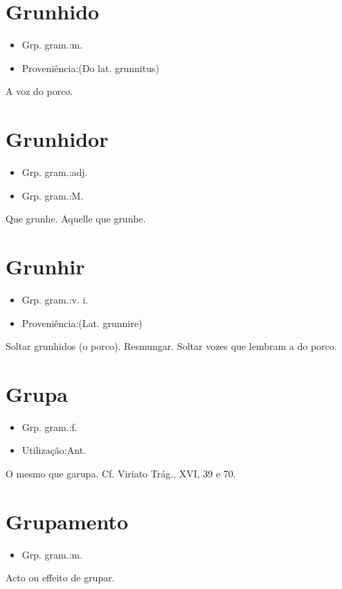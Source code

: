 \section{Grunhido}
\begin{itemize}
\item {Grp. gram.:m.}
\end{itemize}
\begin{itemize}
\item {Proveniência:(Do lat. \textunderscore grunnitus\textunderscore )}
\end{itemize}
A voz do porco.
\section{Grunhidor}
\begin{itemize}
\item {Grp. gram.:adj.}
\end{itemize}
\begin{itemize}
\item {Grp. gram.:M.}
\end{itemize}
Que grunhe.
Aquelle que grunhe.
\section{Grunhir}
\begin{itemize}
\item {Grp. gram.:v. i.}
\end{itemize}
\begin{itemize}
\item {Proveniência:(Lat. \textunderscore grunnire\textunderscore )}
\end{itemize}
Soltar grunhidos (o porco).
Resmungar.
Soltar vozes que lembram a do porco.
\section{Grupa}
\begin{itemize}
\item {Grp. gram.:f.}
\end{itemize}
\begin{itemize}
\item {Utilização:Ant.}
\end{itemize}
O mesmo que \textunderscore garupa\textunderscore . Cf. \textunderscore Viriato Trág.\textunderscore , XVI, 39 e 70.
\section{Grupamento}
\begin{itemize}
\item {Grp. gram.:m.}
\end{itemize}
Acto ou effeito de grupar.
